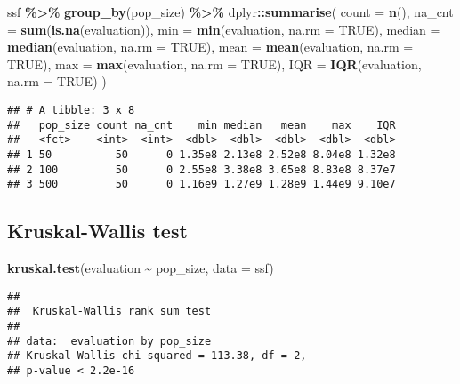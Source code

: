 \documentclass[
]{book}
\newenvironment{Shaded}{\begin{snugshade}}{\end{snugshade}}
\newcommand{\AttributeTok}[1]{\textcolor[rgb]{0.13,0.29,0.53}{#1}}
\newcommand{\ConstantTok}[1]{\textcolor[rgb]{0.56,0.35,0.01}{#1}}
\newcommand{\FunctionTok}[1]{\textcolor[rgb]{0.13,0.29,0.53}{\textbf{#1}}}
\newcommand{\NormalTok}[1]{#1}
\newcommand{\SpecialCharTok}[1]{\textcolor[rgb]{0.81,0.36,0.00}{\textbf{#1}}}
\begin{document}
\begin{Shaded}
\begin{Highlighting}[]
\NormalTok{ssf }\SpecialCharTok{\%\textgreater{}\%}
  \FunctionTok{group\_by}\NormalTok{(pop\_size) }\SpecialCharTok{\%\textgreater{}\%}
\NormalTok{  dplyr}\SpecialCharTok{::}\FunctionTok{summarise}\NormalTok{(}
    \AttributeTok{count =} \FunctionTok{n}\NormalTok{(),}
    \AttributeTok{na\_cnt =} \FunctionTok{sum}\NormalTok{(}\FunctionTok{is.na}\NormalTok{(evaluation)),}
    \AttributeTok{min =} \FunctionTok{min}\NormalTok{(evaluation, }\AttributeTok{na.rm =} \ConstantTok{TRUE}\NormalTok{),}
    \AttributeTok{median =} \FunctionTok{median}\NormalTok{(evaluation, }\AttributeTok{na.rm =} \ConstantTok{TRUE}\NormalTok{),}
    \AttributeTok{mean =} \FunctionTok{mean}\NormalTok{(evaluation, }\AttributeTok{na.rm =} \ConstantTok{TRUE}\NormalTok{),}
    \AttributeTok{max =} \FunctionTok{max}\NormalTok{(evaluation, }\AttributeTok{na.rm =} \ConstantTok{TRUE}\NormalTok{),}
    \AttributeTok{IQR =} \FunctionTok{IQR}\NormalTok{(evaluation, }\AttributeTok{na.rm =} \ConstantTok{TRUE}\NormalTok{)}
\NormalTok{  )}
\end{Highlighting}
\end{Shaded}

\begin{verbatim}
## # A tibble: 3 x 8
##   pop_size count na_cnt    min median   mean    max    IQR
##   <fct>    <int>  <int>  <dbl>  <dbl>  <dbl>  <dbl>  <dbl>
## 1 50          50      0 1.35e8 2.13e8 2.52e8 8.04e8 1.32e8
## 2 100         50      0 2.55e8 3.38e8 3.65e8 8.83e8 8.37e7
## 3 500         50      0 1.16e9 1.27e9 1.28e9 1.44e9 9.10e7
\end{verbatim}

\hypertarget{kruskal-wallis-test-1}{%
\subsection{Kruskal-Wallis test}\label{kruskal-wallis-test-1}}

\begin{Shaded}
\begin{Highlighting}[]
\FunctionTok{kruskal.test}\NormalTok{(evaluation }\SpecialCharTok{\textasciitilde{}}\NormalTok{ pop\_size, }\AttributeTok{data =}\NormalTok{ ssf)}
\end{Highlighting}
\end{Shaded}

\begin{verbatim}
## 
##  Kruskal-Wallis rank sum test
## 
## data:  evaluation by pop_size
## Kruskal-Wallis chi-squared = 113.38, df = 2,
## p-value < 2.2e-16
\end{verbatim}
\end{document}
